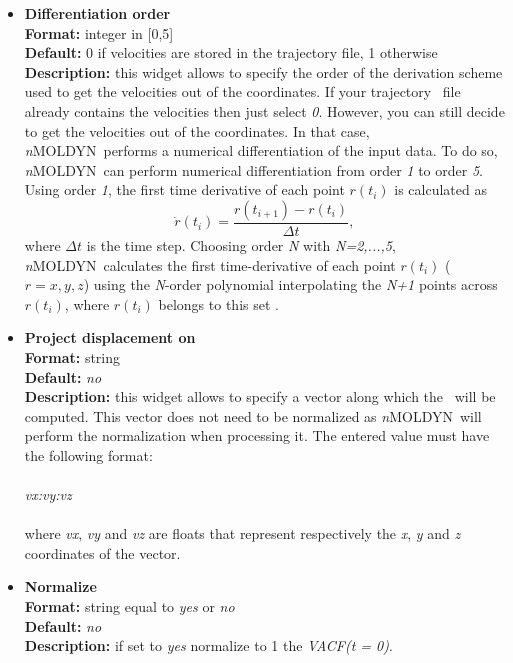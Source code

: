 \documentclass[a4paper,11pt]{report}
\newcommand{\NMOLDYN}{\textit{n}MOLDYN}
\begin{document}
\begin{itemize}
\item \textbf{Differentiation order}\\
\textbf{Format:} integer in [0,5]\\
\textbf{Default:} 0 if velocities are stored in the trajectory file, 1 otherwise\\
\textbf{Description:} this widget allows to specify the order of the derivation scheme used to get the velocities out 
of the coordinates. If your trajectory \NetCDF\ file already contains the velocities then just select \textit{0}.
However, you can still decide to get the velocities out of the coordinates. In that case, \NMOLDYN\ performs a numerical 
differentiation of the input data. To do so, \NMOLDYN\ can perform numerical differentiation from order \textit{1} to 
order \textit{5}. Using order \textit{1}, the first time derivative of each point $r(t_i)$ 
is calculated as
\begin{equation}
\dot{r}(t_i)=\frac{r(t_{i+1})-r(t_{i})} {\Delta t},
\end{equation}
where $\Delta t$ is the time step. 
Choosing order \textit{N} with \textit{N=2,...,5}, \NMOLDYN\ calculates the first time-derivative of each point 
$r(t_i)$ ($r=x,y,z$) using the \textit{N}-order polynomial interpolating the \textit{N+1} points across $r(t_i)$, where $r(t_i)$ 
belongs to this set \cite{Abramowitz}.
\newpage
\item \textbf{Project displacement on}\\
\textbf{Format:} string\\
\textbf{Default:} \textit{no}\\
\textbf{Description:} this widget allows to specify a vector along which the \VACF\ will be computed. This vector does not 
need to be normalized as \NMOLDYN\ will perform the normalization when processing it. The entered value must have the 
following format:
\\\\
\textit{vx:vy:vz}
\\\\
where \textit{vx}, \textit{vy} and \textit{vz} are floats that represent respectively the \textit{x}, \textit{y} and \textit{z} coordinates of the vector.

\item \textbf{Normalize}\\
\textbf{Format:} string equal to \textit{yes} or \textit{no}\\
\textbf{Default:} \textit{no}\\
\textbf{Description:} if set to \textit{yes} normalize to 1 the \textit{VACF(t = 0)}.


\end{itemize}
\end{document}
